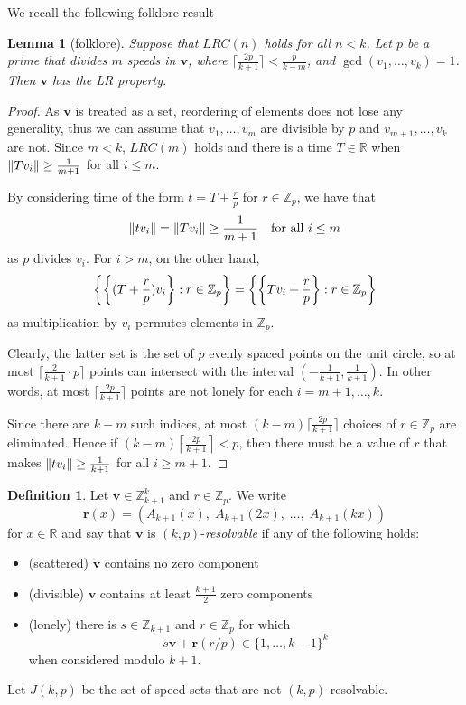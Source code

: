 \documentclass[11pt]{amsart}
\DeclarePairedDelimiter\norm{\lVert}{\rVert}
\DeclarePairedDelimiter\fracpart{\{}{\}}
\newcommand{\set}[1]{\left\{#1\right\}}
\newcommand{\Int}[1]{\mathbb Z_{#1}}
\newcommand{\R}{\mathbb{R}}
\newcommand{\Zko}{\Int{k+1}}
\newcommand{\Zp}{\Int{p}}
\newcommand{\rbf}{\mathbf{r}}
\newcommand{\vbf}{\mathbf{v}}
\newtheorem{lemma}[theorem]{Lemma}
\theoremstyle{definition}
\newtheorem{definition}[theorem]{Definition}
\theoremstyle{remark}
\begin{document}
We recall the following folklore result
\begin{lemma}[folklore]
\label{folklore}
    Suppose that $LRC(n)$ holds for all $n<k$. Let $p$ be a prime that divides $m$ speeds in $\vbf$, 
    where $\lceil\frac{2p}{k+1}\rceil<\frac{p}{k-m}$, and $\gcd(v_1,\ldots,v_k)=1$.
    Then $\vbf$ has the LR property.
\end{lemma}
\begin{proof}
  As $\vbf$ is treated as a set, reordering of elements does not lose any generality, thus we can assume that
  $v_1,\ldots,v_m$ are divisible by $p$ and $v_{m+1},\ldots,v_k$ are not. 
  Since $m<k$, $LRC(m)$ holds and there is a time $T \in \R$ when $\norm{Tv_i} \ge \frac{1}{m+1}$ for all $i\leq m$.
  
  By considering time of the form $t=T+\frac{r}{p}$ for $r \in \Zp$, we have that 
  \[ \norm{tv_i} = \norm{Tv_i} \ge \frac{1}{m+1} \quad \text{for all } i \le m \] as $p$ divides $v_i$. 
  For $i > m$, on the other hand, 
  \[ \set{ \fracpart*{(T + \frac{r}{p}) v_i} : r \in \Zp } = \set{ \fracpart*{Tv_i + \frac{r}{p}} : r \in \Zp } \]
  as multiplication by $v_i$ permutes elements in $\Zp$.

  Clearly, the latter set is the set of $p$ evenly spaced points on the unit circle, 
  so at most $\lceil\frac{2}{k+1}\cdot p\rceil$ points can intersect with the interval $\left(-\frac{1}{k+1},\frac{1}{k+1}\right)$. 
  In other words, at most $\lceil\frac{2p}{k+1}\rceil$ points are not lonely for each $i=m+1,\ldots,k$. 
    
  Since there are $k-m$ such indices, at most $(k-m) \lceil\frac{2p}{k+1}\rceil$ choices of $r\in\Zp$ are eliminated. 
  Hence if $(k-m) \left\lceil\frac{2p}{k+1}\right\rceil < p$, 
  then there must be a value of $r$ that makes $\norm{tv_i}\geq\frac{1}{k+1}$ for all $i\geq m+1$.
\end{proof}

\begin{definition}
\label{def:resolvable}
    Let $\vbf \in \Zko^k$ and $r \in \Zp$. 
    We write \[ \rbf(x)=\left(A_{k+1}(x), \; A_{k+1}(2x), \; \ldots, \; A_{k+1}(kx)\right) \] for $x\in\R$ and 
    say that $\vbf$ is $(k,p)$-\emph{resolvable} if any of the following holds:
    \begin{itemize}
        \item (scattered) $\vbf$ contains no zero component
        \item (divisible) $\vbf$ contains at least $\frac{k+1}{2}$ zero components
        \item (lonely) there is $s \in \Zko$ and $r \in \Zp$ for which
        \[ s\vbf + \rbf(r/p) \in \{1,\ldots,k-1\}^k\] when considered modulo $k+1$.
    \end{itemize}
    Let $J(k,p)$ be the set of speed sets that are not $(k,p)$-resolvable.
\end{definition}
\end{document}

